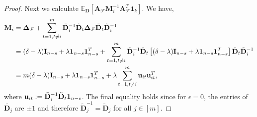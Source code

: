 \documentclass[journal,draftcls,onecolumn]{IEEEtran}
\theoremstyle{mystyle}
\newcommand{\bfD}{\mathbf{D}}
\newcommand{\bfI}{\mathbf{I}}
\newcommand{\bfM}{\mathbf{M}}
\newcommand{\cF}{\mathcal{F}}
\begin{document}
\begin{proof}
Next we calculate $\mathbb{E}_{\bfD} [\mathbf{A}_{\cF}\bfM_i^{-1}\mathbf{A}_{\cF}^T \mathbf{1}_k]$. 
We have,
\begin{align*}
\mathbf{M}_i &= \mathbf{\Delta}_{\cF} + \sum_{t = 1, t\ne i}^m\tilde{\bf{D}}_i^{-1}\tilde{\bf{D}}_t \mathbf{\Delta}_{\cF} \tilde{\bf{D}}_t\tilde{\bf{D}}_i^{-1}\\
&= (\delta - \lambda) \mathbf{I}_{n-s} + \lambda \mathbf{1}_{n-s} \mathbf{1}_{n-s}^T + \sum_{t = 1, t\ne i}^m \tilde{\bf{D}}_i^{-1}\tilde{\bf{D}}_t  \left[ (\delta - \lambda) \mathbf{I}_{n-s} + \lambda \mathbf{1}_{n-s} \mathbf{1}_{n-s}^T \right]\tilde{\bf{D}}_t\tilde{\bf{D}}_i^{-1}\\
& = m(\delta - \lambda) \bfI_{n-s} + \lambda \mathbf{1}_{n-s} \mathbf{1}_{n-s}^T+ \lambda \sum_{t = 1, t\ne i}^m\mathbf{u}_{it} \mathbf{u}_{it}^T,
\end{align*}
where $\mathbf{u}_{it}:= \tilde{\bf{D}}_i^{-1}\tilde{\bf{D}}_t \mathbf{1}_{n-s}$. The final equality holds since for $\epsilon = 0$, the entries of $\tilde{\bfD_{j}}$ are $\pm 1$ and therefore $\tilde{\mathbf{D}}_j^{-1} =\tilde{\mathbf{D}}_j$ for all $j \in [m]$. %

\end{proof}
\end{document}
